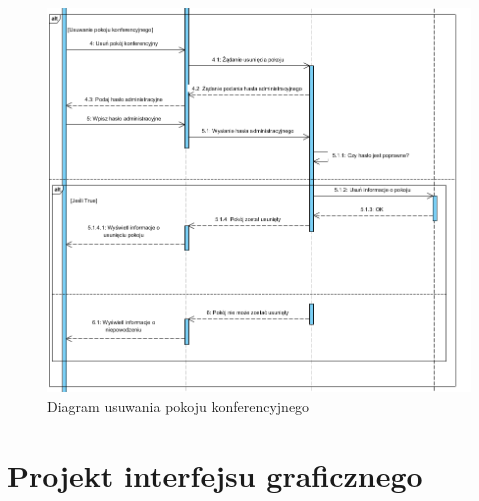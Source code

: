 \documentclass{article}
\begin{document}
	\begin{figure}[H]
		\centering
		\hspace*{-2cm} 
		\includegraphics[scale=0.9]{seq3}
		\caption[]{Diagram usuwania pokoju konferencyjnego}
		\label{fig:seq3}
	\end{figure}
	\section{Projekt interfejsu graficznego}
\end{document}
